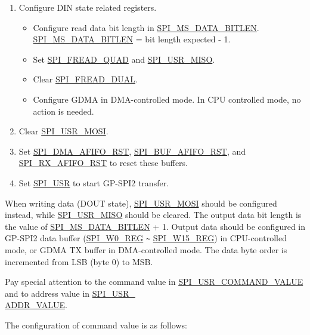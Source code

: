 \documentclass[main\_\_EN.tex]{subfiles}
\begin{document}
\begin{enumerate}
    \item Configure DIN state related registers.
        \begin{itemize}
            \item Configure read data bit length in \hyperref[fielddesc:SPIMSDATABITLEN]{SPI\_MS\_DATA\_BITLEN}. \hyperref[fielddesc:SPIMSDATABITLEN]{SPI\_MS\_DATA\_BITLEN} = bit length expected - 1.
            \item Set \hyperref[fielddesc:SPIFREADQUAD]{SPI\_FREAD\_QUAD} and \hyperref[fielddesc:SPIUSRMISO]{SPI\_USR\_MISO}.
            \item Clear \hyperref[fielddesc:SPIFREADDUAL]{SPI\_FREAD\_DUAL}.
            \item Configure GDMA in DMA-controlled mode. In CPU controlled mode, no action is needed.
        \end{itemize}

    \item Clear \hyperref[fielddesc:SPIUSRMOSI]{SPI\_USR\_MOSI}.
    \item Set \hyperref[fielddesc:SPIDMAAFIFORST]{SPI\_DMA\_AFIFO\_RST}, \hyperref[fielddesc:SPIBUFAFIFORST]{SPI\_BUF\_AFIFO\_RST}, and \hyperref[fielddesc:SPIRXAFIFORST]{SPI\_RX\_AFIFO\_RST} to reset these buffers.

    \item Set \hyperref[fielddesc:SPIUSR]{SPI\_USR} to start GP-SPI2 transfer.
\end{enumerate}

When writing data (DOUT state), \hyperref[fielddesc:SPIUSRMOSI]{SPI\_USR\_MOSI} should be configured instead, while \hyperref[fielddesc:SPIUSRMISO]{SPI\_USR\_MISO} should be cleared. The output data bit length is the value of \hyperref[fielddesc:SPIMSDATABITLEN]{SPI\_MS\_DATA\_BITLEN} + 1. Output data should be configured in GP-SPI2 data buffer (\hyperref[regdesc:SPIW0REG]{SPI\_W0\_REG} \verb+~+ \hyperref[regdesc:SPIW15REG]{SPI\_W15\_REG}) in CPU-controlled mode, or GDMA TX buffer in DMA-controlled mode. The data byte order is incremented from LSB (byte 0) to MSB.

Pay special attention to the command value in \hyperref[fielddesc:SPIUSRCOMMANDVALUE]{SPI\_USR\_COMMAND\_VALUE} and to address value in \hyperref[fielddesc:SPIUSRADDRVALUE]{SPI\_USR\_\\ADDR\_VALUE}.

The configuration of command value is as follows:
\end{document}
